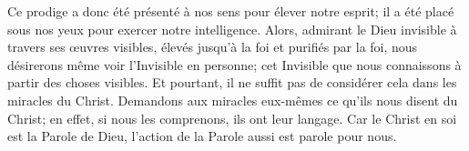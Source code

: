 Ce prodige a donc été présenté à nos sens pour élever notre esprit;
	il a été placé sous nos yeux pour exercer notre intelligence.
Alors, admirant le Dieu invisible à travers ses œuvres visibles,
	élevés jusqu’à la foi et purifiés par la foi,
	nous désirerons même voir l’Invisible en personne;
	cet Invisible que nous connaissons à partir des choses visibles.
Et pourtant, il ne suffit pas de considérer cela dans les miracles du Christ.
Demandons aux miracles eux-mêmes ce qu’ils nous disent du Christ;
	en effet, si nous les comprenons, ils ont leur langage.
Car le Christ en soi est la Parole de Dieu,
	l’action de la Parole aussi est parole pour nous.
